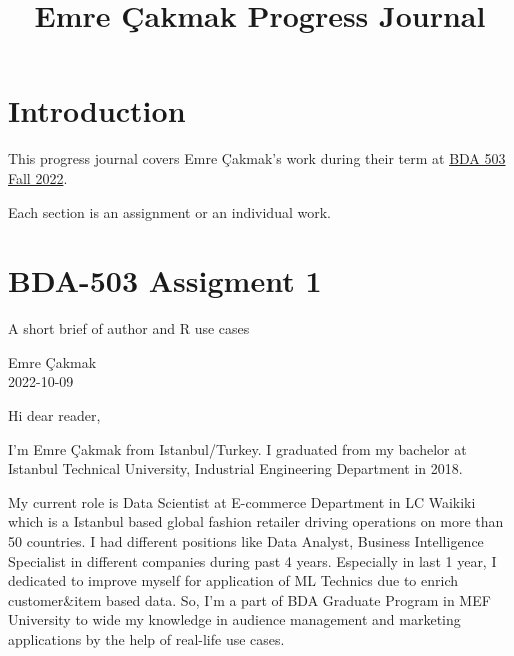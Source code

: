 \documentclass[
  letterpaper,
  DIV=11,
  numbers=noendperiod]{scrreprt}
\title{Emre Çakmak Progress Journal}
\author{}
\date{}
\renewcommand*\contentsname{Table of contents}
\newcommand\contentsname{Table of contents}
\begin{document}
\maketitle
\ifdefined\Shaded\renewenvironment{Shaded}{\begin{tcolorbox}[borderline west={3pt}{0pt}{shadecolor}, frame hidden, enhanced, breakable, sharp corners, boxrule=0pt, interior hidden]}{\end{tcolorbox}}\fi

\renewcommand*\contentsname{Table of contents}
{
\hypersetup{linkcolor=}
\setcounter{tocdepth}{2}
\tableofcontents
}

\hypertarget{introduction}{%
\chapter*{Introduction}\label{introduction}}

This progress journal covers Emre Çakmak's work during their term at
\href{https://mef-bda503.github.io/fall22/}{BDA 503 Fall 2022}.

Each section is an assignment or an individual work.


\hypertarget{bda-503-assigment-1}{%
\chapter{BDA-503 Assigment 1}\label{bda-503-assigment-1}}

A short brief of author and R use cases

Emre Çakmak\\
2022-10-09

\hfill\break

Hi dear reader,

I'm Emre Çakmak from Istanbul/Turkey. I graduated from my bachelor at
Istanbul Technical University, Industrial Engineering Department in
2018.

My current role is Data Scientist at E-commerce Department in LC Waikiki
which is a Istanbul based global fashion retailer driving operations on
more than 50 countries. I had different positions like Data Analyst,
Business Intelligence Specialist in different companies during past 4
years. Especially in last 1 year, I dedicated to improve myself for
application of ML Technics due to enrich customer\&item based data. So,
I'm a part of BDA Graduate Program in MEF University to wide my
knowledge in audience management and marketing applications by the help
of real-life use cases.
\end{document}
